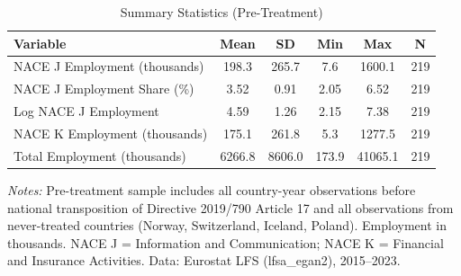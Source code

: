 \begin{table}[htbp]
\centering
\caption{Summary Statistics (Pre-Treatment)}
\label{tab:summary}
\begin{tabular}{lccccc}
\hline\hline
Variable & Mean & SD & Min & Max & N \\
\hline
NACE J Employment (thousands) & 198.3 & 265.7 & 7.6 & 1600.1 & 219 \\
NACE J Employment Share (\%) & 3.52 & 0.91 & 2.05 & 6.52 & 219 \\
Log NACE J Employment & 4.59 & 1.26 & 2.15 & 7.38 & 219 \\
NACE K Employment (thousands) & 175.1 & 261.8 & 5.3 & 1277.5 & 219 \\
Total Employment (thousands) & 6266.8 & 8606.0 & 173.9 & 41065.1 & 219 \\
\hline\hline
\end{tabular}
\begin{tablenotes}[flushleft]\small
\item \textit{Notes:} Pre-treatment sample includes all country-year observations before national transposition of Directive 2019/790 Article 17 and all observations from never-treated countries (Norway, Switzerland, Iceland, Poland). Employment in thousands. NACE J = Information and Communication; NACE K = Financial and Insurance Activities. Data: Eurostat LFS (lfsa\_egan2), 2015--2023.
\end{tablenotes}
\end{table}

